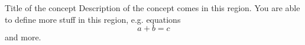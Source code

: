 \begin{block}{Title of the concept}
	Description of the concept comes in this region. You are able to define more stuff in this region, e.g. equations
	\begin{equation}
		a + b = c
	\end{equation}
	and more.
\end{block}